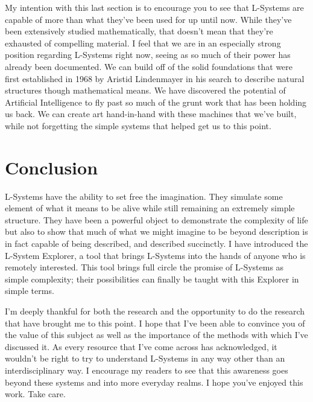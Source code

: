 \documentclass[12pt,twoside]{reedthesis}
\begin{document}
	My intention with this last section is to encourage you to see that L-Systems are capable of more than what they've been used for up until now. While they've been extensively studied mathematically, that doesn't mean that they're exhausted of compelling material. I feel that we are in an especially strong position regarding L-Systems right now, seeing as so much of their power has already been documented. We can build off of the solid foundations that were first established in 1968 by Aristid Lindenmayer in his search to describe natural structures though mathematical means. We have discovered the potential of Artificial Intelligence to fly past so much of the grunt work that has been holding us back. We can create art hand-in-hand with these machines that we've built, while not forgetting the simple systems that helped get us to this point.
	
\chapter*{Conclusion}
	\setcounter{section}{0}
	
	L-Systems have the ability to set free the imagination. They simulate some element of what it means to be alive while still remaining an extremely simple structure. They have been a powerful object to demonstrate the complexity of life but also to show that much of what we might imagine to be beyond description is in fact capable of being described, and described succinctly. I have introduced the L-System Explorer, a tool that brings L-Systems into the hands of anyone who is remotely interested. This tool brings full circle the promise of L-Systems as simple complexity; their possibilities can finally be taught with this Explorer in simple terms.
	
	I'm deeply thankful for both the research and the opportunity to do the research that have brought me to this point. I hope that I've been able to convince you of the value of this subject as well as the importance of the methods with which I've discussed it. As every resource that I've come across has acknowledged, it wouldn't be right to try to understand L-Systems in any way other than an interdisciplinary way. I encourage my readers to see that this awareness goes beyond these systems and into more everyday realms. I hope you've enjoyed this work. Take care.

    \appendix
\end{document}

